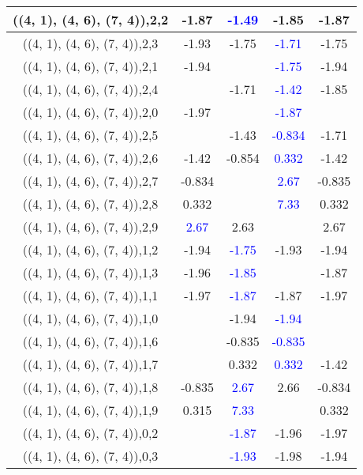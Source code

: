 \documentclass{article}
\begin{document}
\begin{center}
\begin{longtable}{|c|c|c|c|c|}
        	\hline
        	((4, 1), (4, 6), (7, 4)),2,2&-1.87& \textcolor{blue}{-1.49}&-1.85&-1.87\\
        	\hline
        	((4, 1), (4, 6), (7, 4)),2,3&-1.93&-1.75& \textcolor{blue}{-1.71}&-1.75\\
        	\hline
        	((4, 1), (4, 6), (7, 4)),2,1&-1.94&& \textcolor{blue}{-1.75}&-1.94\\
        	\hline
        	((4, 1), (4, 6), (7, 4)),2,4&&-1.71& \textcolor{blue}{-1.42}&-1.85\\
        	\hline
        	((4, 1), (4, 6), (7, 4)),2,0&-1.97&& \textcolor{blue}{-1.87}&\\
        	\hline
        	((4, 1), (4, 6), (7, 4)),2,5&&-1.43& \textcolor{blue}{-0.834}&-1.71\\
        	\hline
        	((4, 1), (4, 6), (7, 4)),2,6&-1.42&-0.854& \textcolor{blue}{0.332}&-1.42\\
        	\hline
        	((4, 1), (4, 6), (7, 4)),2,7&-0.834&& \textcolor{blue}{2.67}&-0.835\\
        	\hline
        	((4, 1), (4, 6), (7, 4)),2,8&0.332&& \textcolor{blue}{7.33}&0.332\\
        	\hline
        	((4, 1), (4, 6), (7, 4)),2,9& \textcolor{blue}{2.67}&2.63&&2.67\\
        	\hline
        	((4, 1), (4, 6), (7, 4)),1,2&-1.94& \textcolor{blue}{-1.75}&-1.93&-1.94\\
        	\hline
        	((4, 1), (4, 6), (7, 4)),1,3&-1.96& \textcolor{blue}{-1.85}&&-1.87\\
        	\hline
        	((4, 1), (4, 6), (7, 4)),1,1&-1.97& \textcolor{blue}{-1.87}&-1.87&-1.97\\
        	\hline
        	((4, 1), (4, 6), (7, 4)),1,0&&-1.94& \textcolor{blue}{-1.94}&\\
        	\hline
        	((4, 1), (4, 6), (7, 4)),1,6&&-0.835& \textcolor{blue}{-0.835}&\\
        	\hline
        	((4, 1), (4, 6), (7, 4)),1,7&&0.332& \textcolor{blue}{0.332}&-1.42\\
        	\hline
        	((4, 1), (4, 6), (7, 4)),1,8&-0.835& \textcolor{blue}{2.67}&2.66&-0.834\\
        	\hline
        	((4, 1), (4, 6), (7, 4)),1,9&0.315& \textcolor{blue}{7.33}&&0.332\\
        	\hline
        	((4, 1), (4, 6), (7, 4)),0,2&& \textcolor{blue}{-1.87}&-1.96&-1.97\\
        	\hline
        	((4, 1), (4, 6), (7, 4)),0,3&& \textcolor{blue}{-1.93}&-1.98&-1.94\\

\end{longtable}
\end{center}
\end{document}

